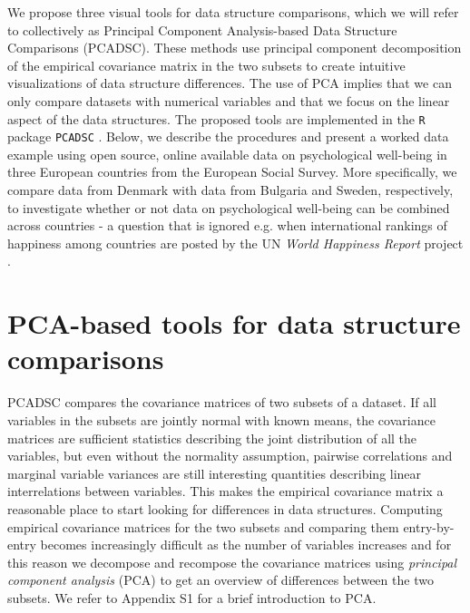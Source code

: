 \documentclass[a4paper,12pt]{article}
\begin{document}
We propose three visual tools for data structure comparisons, which we will refer to collectively as Principal Component Analysis-based Data Structure Comparisons (PCADSC). These methods use principal component decomposition of the empirical covariance matrix in the two subsets to create intuitive visualizations of data structure differences. The use of PCA implies that we can only compare datasets with numerical variables and that we focus on the linear aspect of the  data structures. The proposed tools are implemented in the \texttt{R} package \texttt{PCADSC} \cite{PCADSC}. Below, we describe the procedures and present a worked data example using open source, online available data on psychological well-being in three European countries from the European Social Survey. More specifically, we compare data from Denmark with data from Bulgaria and Sweden, respectively, to investigate whether or not data on psychological well-being can be combined across countries - a question that is ignored e.g. when international rankings of happiness among countries are posted by the UN \textit{World Happiness Report} project \cite{WHR2016}.


\section*{PCA-based tools for data structure comparisons}\label{sec:pcadscintro}


PCADSC compares the covariance matrices of two subsets of a dataset. If all variables in the subsets are jointly normal with known means, the covariance matrices are sufficient statistics describing the joint distribution of all the variables, but even without the normality assumption, pairwise correlations and marginal variable variances are still interesting quantities describing linear interrelations between variables. This makes the empirical covariance matrix a reasonable place to start looking for differences in data structures. Computing empirical covariance matrices for the two subsets and comparing them entry-by-entry becomes increasingly difficult as the number of variables increases and for this reason we decompose and recompose the covariance matrices using \textit{principal component analysis} (PCA) to get an overview of differences between the two subsets. We refer to Appendix S1 for a brief introduction to PCA. 
\end{document}
